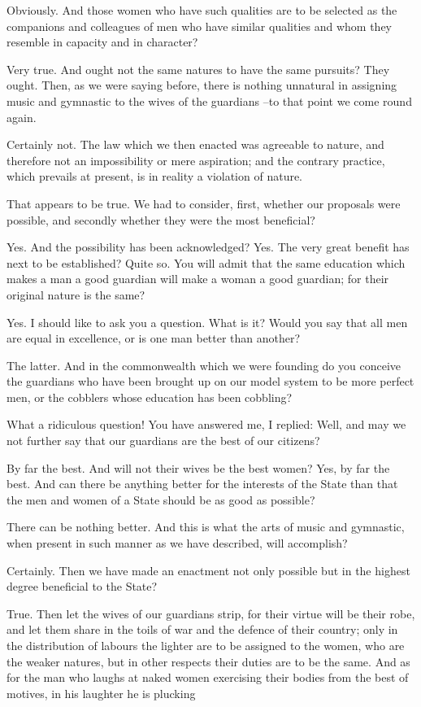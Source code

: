 Obviously.
And those women who have such qualities are to be selected as the companions and colleagues of men who have similar qualities and whom they resemble in capacity and in character?

Very true.
And ought not the same natures to have the same pursuits?
They ought.
Then, as we were saying before, there is nothing unnatural in assigning music and gymnastic to the wives of the guardians --to that point we come round again.

Certainly not.
The law which we then enacted was agreeable to nature, and therefore not an impossibility or mere aspiration; and the contrary practice, which prevails at present, is in reality a violation of nature.

That appears to be true.
We had to consider, first, whether our proposals were possible, and secondly whether they were the most beneficial?

Yes.
And the possibility has been acknowledged?
Yes.
The very great benefit has next to be established?
Quite so.
You will admit that the same education which makes a man a good guardian will make a woman a good guardian; for their original nature is the same?

Yes.
I should like to ask you a question.
What is it?
Would you say that all men are equal in excellence, or is one man better than another?

The latter.
And in the commonwealth which we were founding do you conceive the guardians who have been brought up on our model system to be more perfect men, or the cobblers whose education has been cobbling?

What a ridiculous question!
You have answered me, I replied: Well, and may we not further say that our guardians are the best of our citizens?

By far the best.
And will not their wives be the best women?
Yes, by far the best.
And can there be anything better for the interests of the State than that the men and women of a State should be as good as possible?

There can be nothing better.
And this is what the arts of music and gymnastic, when present in such manner as we have described, will accomplish?

Certainly.
Then we have made an enactment not only possible but in the highest degree beneficial to the State?

True.
Then let the wives of our guardians strip, for their virtue will be their robe, and let them share in the toils of war and the defence of their country; only in the distribution of labours the lighter are to be assigned to the women, who are the weaker natures, but in other respects their duties are to be the same. And as for the man who laughs at naked women exercising their bodies from the best of motives, in his laughter he is plucking

